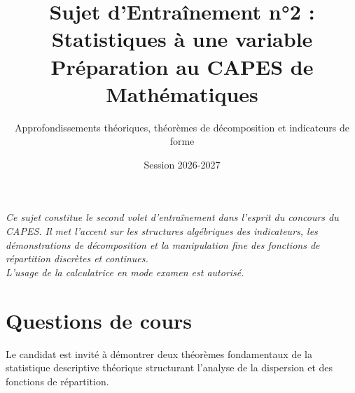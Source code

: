 \documentclass[11pt,a4paper]{article}
\title{\textbf{Sujet d'Entraînement n°2 : Statistiques à une variable}\\\large Préparation au CAPES de Mathématiques}
\author{Approfondissements théoriques, théorèmes de décomposition et indicateurs de forme}
\date{Session 2026-2027}
\begin{document}
\maketitle

\vspace{1cm}

\begin{center}
\textit{Ce sujet constitue le second volet d'entraînement dans l'esprit du concours du CAPES. Il met l'accent sur les structures algébriques des indicateurs, les démonstrations de décomposition et la manipulation fine des fonctions de répartition discrètes et continues.\\ \vspace{0.5cm} L'usage de la calculatrice en mode examen est autorisé.}
\end{center}

\vspace{1.5cm}

\section*{Questions de cours}

Le candidat est invité à démontrer deux théorèmes fondamentaux de la statistique descriptive théorique structurant l'analyse de la dispersion et des fonctions de répartition.
\end{document}
